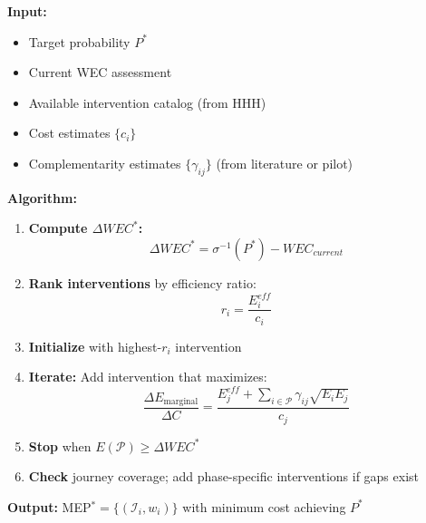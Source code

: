 \begin{tcolorbox}[colback=blue!5!white, colframe=blue!75!black,
    title=The MEP Design Algorithm]

\textbf{Input:}
\begin{itemize}[nosep]
\item Target probability $P^*$
\item Current WEC assessment
\item Available intervention catalog (from HHH)
\item Cost estimates $\{c_i\}$
\item Complementarity estimates $\{\gamma_{ij}\}$ (from literature or pilot)
\end{itemize}

\textbf{Algorithm:}
\begin{enumerate}
\item \textbf{Compute $\Delta WEC^*$:}
\begin{equation}
\Delta WEC^* = \sigma^{-1}(P^*) - WEC_{current}
\end{equation}

\item \textbf{Rank interventions} by efficiency ratio:
\begin{equation}
r_i = \frac{E_i^{eff}}{c_i}
\end{equation}

\item \textbf{Initialize} with highest-$r_i$ intervention

\item \textbf{Iterate:} Add intervention that maximizes:
\begin{equation}
\frac{\Delta E_{\text{marginal}}}{\Delta C} = \frac{E_j^{eff} + \sum_{i \in \mathcal{P}} \gamma_{ij}\sqrt{E_i E_j}}{c_j}
\end{equation}

\item \textbf{Stop} when $E(\mathcal{P}) \geq \Delta WEC^*$

\item \textbf{Check} journey coverage; add phase-specific interventions if gaps exist
\end{enumerate}

\textbf{Output:} MEP$^* = \{(\mathcal{I}_i, w_i)\}$ with minimum cost achieving $P^*$
\end{tcolorbox}




